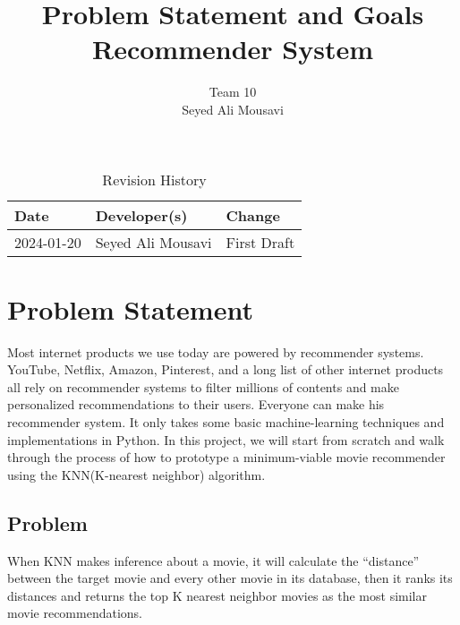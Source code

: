 \documentclass{article}
\title{Problem Statement and Goals \\ Recommender System}
\author{Team 10 \\ Seyed Ali Mousavi}
\date{}
\begin{document}
\maketitle



\begin{table}[hp]
\caption{Revision History} \label{TblRevisionHistory}
\begin{tabularx}{\textwidth}{llX}
\toprule
\textbf{Date} & \textbf{Developer(s)} & \textbf{Change}\\
\midrule
2024-01-20 & Seyed Ali Mousavi & First Draft\\
\bottomrule
\end{tabularx}
\end{table}

\section{Problem Statement}


Most internet products we use today are powered by recommender systems. YouTube, Netflix, Amazon, Pinterest, and a long list of other internet products all rely on recommender systems to filter millions of contents and make personalized recommendations to their users. Everyone can make his recommender system. It only takes some basic machine-learning techniques and implementations in Python. In this project, we will start from scratch and walk through the process of how to prototype a minimum-viable movie recommender using the KNN(K-nearest neighbor) algorithm.


\subsection{Problem}

When KNN makes inference about a movie, it will calculate the “distance” between the target movie and every other movie in its database, then it ranks its distances and returns the top K nearest neighbor movies as the most similar movie recommendations.
\end{document}
